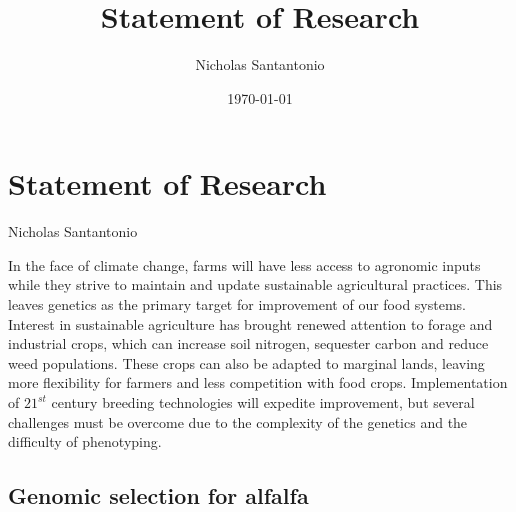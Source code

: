 \documentclass[11pt]{article}
\title{Statement of Research}
\author{Nicholas Santantonio}
\date{\today}
\begin{document}
\section*{\centering Statement of Research}
\begin{center} Nicholas Santantonio \end{center}







\noindent In the face of climate change, farms will have less access to agronomic inputs while they strive to maintain and update sustainable agricultural practices. This leaves genetics as the primary target for improvement of our food systems. Interest in sustainable agriculture has brought renewed attention to forage and industrial crops, which can increase soil nitrogen, sequester carbon and reduce weed populations. These crops can also be adapted to marginal lands, leaving more flexibility for farmers and less competition with food crops. Implementation of $21^{st}$ century breeding technologies will expedite improvement, but several challenges must be overcome due to the complexity of the genetics and the difficulty of phenotyping.%



\subsection*{Genomic selection for alfalfa}
\end{document}
